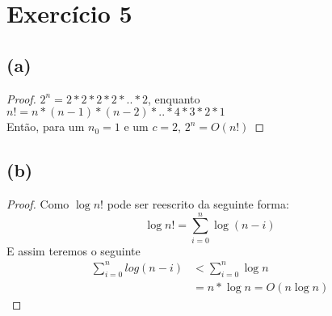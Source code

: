 \documentclass{article}
\begin{document}
\section{Exercício 5}
\subsection*{(a)}
\begin{proof}
    \hfill \break
    $2^n = 2 * 2 * 2 * 2 * .. * 2$, enquanto\\
    $n!  = n * (n - 1) * (n - 2) * .. * 4 * 3 * 2 * 1$\\

    Então, para um $n_0 = 1$ e um $c = 2$, $2^n = O(n!)$
\end{proof}

\subsection*{(b)}
\begin{proof}
    \hfill \break
    Como $\log n!$ pode ser reescrito da seguinte forma:
    \begin{equation}
        \log n! = \sum\limits_{i = 0}^{n}\log(n - i)
    \end{equation}
    E assim teremos o seguinte
    \begin{equation}
        \begin{split}
        \sum\limits_{i=0}^{n}log(n-i) & < \sum\limits_{i=0}^{n}\log n\\
        & =n * \log n = O(n\log n)
    \end{split}
    \end{equation}
\end{proof}
\end{document}
